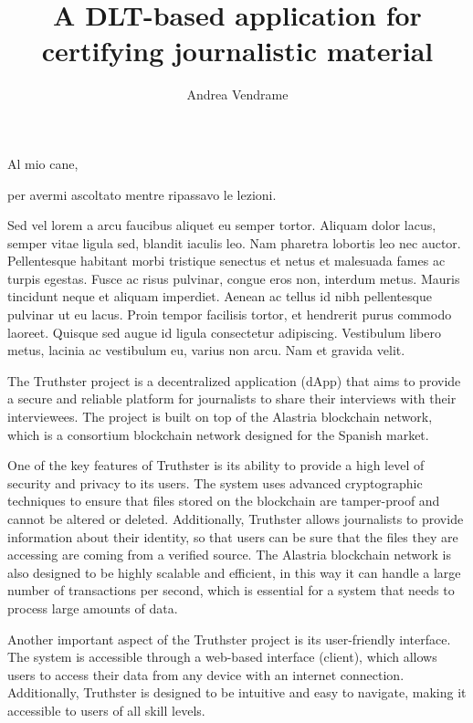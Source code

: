 \documentclass[target=mst,aauheader=]{thud}
\title{A DLT-based application for certifying journalistic material}
\author{Andrea Vendrame}
\begin{document}
\maketitle

\begin{dedication}
	Al mio cane,\par per avermi ascoltato mentre ripassavo le lezioni.
\end{dedication}

\acknowledgements
Sed vel lorem a arcu faucibus aliquet eu semper tortor. Aliquam dolor lacus, semper vitae ligula sed, blandit iaculis leo. Nam pharetra lobortis leo nec auctor. Pellentesque habitant morbi tristique senectus et netus et malesuada fames ac turpis egestas. Fusce ac risus pulvinar, congue eros non, interdum metus. Mauris tincidunt neque et aliquam imperdiet. Aenean ac tellus id nibh pellentesque pulvinar ut eu lacus. Proin tempor facilisis tortor, et hendrerit purus commodo laoreet. Quisque sed augue id ligula consectetur adipiscing. Vestibulum libero metus, lacinia ac vestibulum eu, varius non arcu. Nam et gravida velit.

\abstract
The Truthster project is a decentralized application (dApp) that aims to provide a secure and reliable platform for journalists to share their interviews with their interviewees. The project is built on top of the Alastria blockchain network, which is a consortium blockchain network designed for the Spanish market.

One of the key features of Truthster is its ability to provide a high level of security and privacy to its users. The system uses advanced cryptographic techniques to ensure that files stored on the blockchain are tamper-proof and cannot be altered or deleted. Additionally, Truthster allows journalists to provide information about their identity, so that users can be sure that the files they are accessing are coming from a verified source.
The Alastria blockchain network is also designed to be highly scalable and efficient, in this way it can handle a large number of transactions per second, which is essential for a system that needs to process large amounts of data.

Another important aspect of the Truthster project is its user-friendly interface. The system is accessible through a web-based interface (client), which allows users to access their data from any device with an internet connection. Additionally, Truthster is designed to be intuitive and easy to navigate, making it accessible to users of all skill levels.
\end{document}
